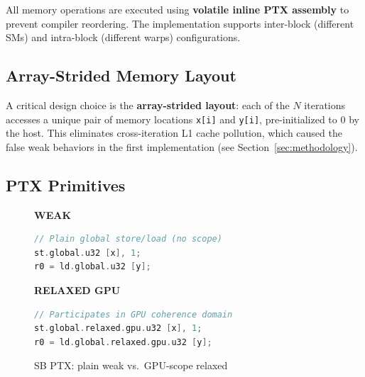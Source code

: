 \documentclass[a4paper]{article}
\begin{document}
All memory operations are executed using \textbf{volatile inline PTX assembly} to prevent compiler reordering.
The implementation supports inter-block (different SMs) and intra-block (different warps) configurations.

\subsection{Array-Strided Memory Layout}

A critical design choice is the \textbf{array-strided layout}: each of the $N$ iterations accesses a unique pair of memory locations \texttt{x[i]} and \texttt{y[i]}, pre-initialized to 0 by the host.
This eliminates cross-iteration L1 cache pollution, which caused the false weak behaviors in the first implementation (see Section~\ref{sec:methodology}).

\subsection{PTX Primitives}

\begin{figure}[h]
\centering
\begin{minipage}{0.45\textwidth}
\centering
\textbf{WEAK}
\begin{lstlisting}[language=C]
// Plain global store/load (no scope)
st.global.u32 [x], 1;
r0 = ld.global.u32 [y];
\end{lstlisting}
\end{minipage}
\hfill
\begin{minipage}{0.45\textwidth}
\centering
\textbf{RELAXED GPU}
\begin{lstlisting}[language=C]
// Participates in GPU coherence domain
st.global.relaxed.gpu.u32 [x], 1;
r0 = ld.global.relaxed.gpu.u32 [y];
\end{lstlisting}
\end{minipage}
\caption{SB PTX: plain weak vs.\ GPU-scope relaxed}
\end{figure}
\end{document}
